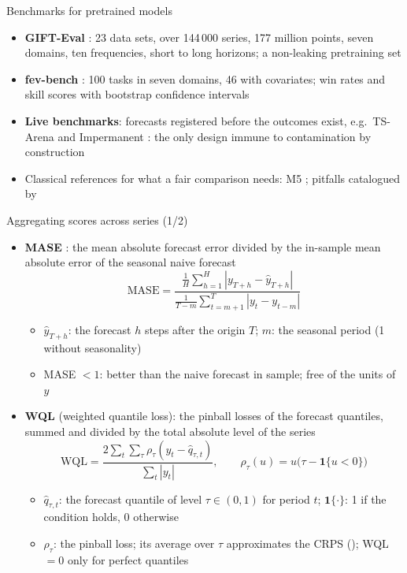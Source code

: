 \begin{frame}{Benchmarks for pretrained models}
\itemsize{\small}
\begin{itemize}
    \item \textbf{GIFT-Eval} : 23 data sets, over 144\,000 series, 177 million points, seven domains, ten frequencies, short to long horizons; a non-leaking pretraining set
    \item \textbf{fev-bench} : 100 tasks in seven domains, 46 with covariates; win rates and skill scores with bootstrap confidence intervals
    \item \textbf{Live benchmarks}: forecasts registered before the outcomes exist, e.g.\ TS-Arena  and Impermanent : the only design immune to contamination by construction
    \item Classical references for what a fair comparison needs: M5 ; pitfalls catalogued by 
\end{itemize}
\end{frame}

\begin{frame}{Aggregating scores across series (1/2)}
\itemsize{\small}
\begin{itemize}
    \item \textbf{MASE} : the mean absolute forecast error divided by the in-sample mean absolute error of the seasonal naive forecast \[ \mathrm{MASE} = \frac{\frac{1}{H}\sum_{h=1}^{H}|y_{T+h} - \hat y_{T+h}|}{\frac{1}{T-m}\sum_{t=m+1}^{T}|y_t - y_{t-m}|} \]
    \begin{itemize}
        \item $\hat y_{T+h}$: the forecast $h$ steps after the origin $T$; $m$: the seasonal period (1 without seasonality)
        \item MASE $< 1$: better than the naive forecast in sample; free of the units of $y$
    \end{itemize}
    \item \textbf{WQL} (weighted quantile loss): the pinball losses of the forecast quantiles, summed and divided by the total absolute level of the series \[ \mathrm{WQL} = \frac{2\sum_{t}\sum_{\tau}\rho_\tau(y_t - \hat q_{\tau,t})}{\sum_t|y_t|}, \qquad \rho_\tau(u) = u\big(\tau - \mathbf 1\{u < 0\}\big) \]
    \begin{itemize}
        \item $\hat q_{\tau,t}$: the forecast quantile of level $\tau \in (0, 1)$ for period $t$; $\mathbf 1\{\cdot\}$: 1 if the condition holds, 0 otherwise
        \item $\rho_\tau$: the pinball loss; its average over $\tau$ approximates the CRPS (); WQL $= 0$ only for perfect quantiles
    \end{itemize}
\end{itemize}
\end{frame}

